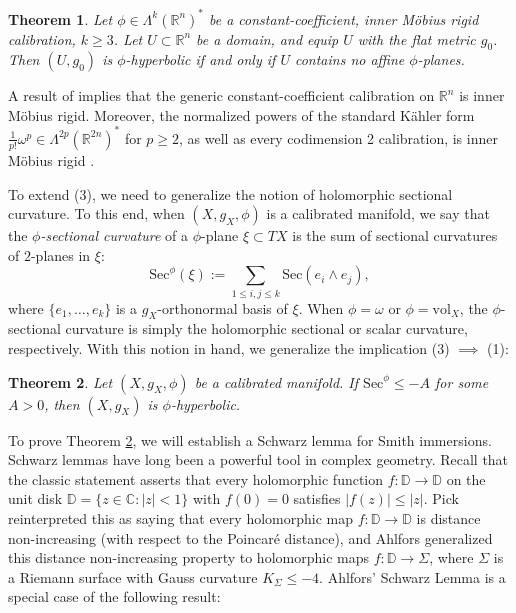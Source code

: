 \documentclass[11pt]{article}
\newcommand{\R}{\mathbb{R}}
\newcommand{\C}{\mathbb{C}}
\newcommand{\vol}{\mathrm{vol}}
\newtheorem{thm}{Theorem}[section]
\theoremstyle{definition}
\numberwithin{equation}{section}
\begin{document}
\begin{thm} \label{thm:Main1} Let $\phi \in \Lambda^k(\R^n)^*$ be a constant-coefficient, inner M\"{o}bius rigid calibration, $k \geq 3$.  Let $U \subset \R^n$ be a domain, and equip $U$ with the flat metric $g_0$.  Then $(U, g_0)$ is $\phi$-hyperbolic if and only if $U$ contains no affine $\phi$-planes. 
\end{thm}

A result of \cite{ikonen2024liouville} implies that the generic constant-coefficient calibration on $\R^n$ is inner M\"{o}bius rigid.  Moreover, the normalized powers of the standard K\"{a}hler form $\frac{1}{p!}\omega^p \in \Lambda^{2p}(\R^{2n})^*$ for $p \geq 2$, as well as every codimension 2 calibration, is inner M\"{o}bius rigid \cite{ikonen2024liouville}.


To extend (3), we need to generalize the notion of holomorphic sectional curvature.  To this end, when $(X, g_X, \phi)$ is a calibrated manifold, we say that the \emph{$\phi$-sectional curvature} of a $\phi$-plane $\xi \subset TX$ is the sum of sectional curvatures of $2$-planes in $\xi$:
$$\mathrm{Sec}^\phi(\xi) := \sum_{1 \leq i,j \leq k} \mathrm{Sec}(e_i \wedge e_j),$$
where $\{e_1, \ldots, e_k\}$ is a $g_X$-orthonormal basis of $\xi$.  When $\phi = \omega$ or $\phi = \vol_X$, the $\phi$-sectional curvature is simply the holomorphic sectional or scalar curvature, respectively.  With this notion in hand, we generalize the implication (3) $\implies$ (1):

\begin{thm} \label{thm:Main2} Let $(X, g_X, \phi)$ be a calibrated manifold.  If $\mathrm{Sec}^\phi \leq -A$ for some $A > 0$, then $(X, g_X)$ is $\phi$-hyperbolic.
\end{thm}

To prove Theorem \ref{thm:Main2}, we will establish a Schwarz lemma for Smith immersions.  Schwarz lemmas have long been a powerful tool in complex geometry.  Recall that the classic statement asserts that every holomorphic function $f \colon \mathbb{D} \to \mathbb{D}$ on the unit disk $\mathbb{D} = \{z \in \C \colon |z| < 1\}$ with $f(0) = 0$ satisfies $|f(z)| \leq |z|$.  Pick reinterpreted this as saying that every holomorphic map $f \colon \mathbb{D} \to \mathbb{D}$ is distance non-increasing (with respect to the Poincar\'{e} distance), and Ahlfors generalized this distance non-increasing property to holomorphic maps $f \colon \mathbb{D} \to \Sigma$, where $\Sigma$ is a Riemann surface with Gauss curvature $K_\Sigma \leq -4$.  Ahlfors' Schwarz Lemma is a special case of the following result:
\end{document}
